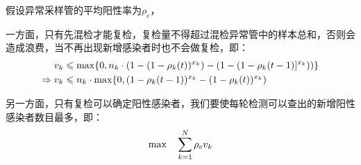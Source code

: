 \documentclass[withoutpreface,bwprint]{cumcmthesis} %
\begin{document}
假设异常采样管的平均阳性率为$\rho_{e}$，

一方面，只有先混检才能复检，复检量不得超过混检异常管中的样本总和，否则会造成浪费，当不再出现新增感染者时也不会做复检，即：
\begin{align}
    v_k &\leqslant {\rm max} \{0, n_k\cdot(1-(1-\rho_k(t))^{x_k})-(1-(1-\rho_k(t-1)]^{x_k})) \}\\
    \Rightarrow v_k &\leqslant n_k \cdot {\rm max} \{0, (1-\rho_k(t-1))^{x_k}-(1-\rho_k(t))^{x_k})
\end{align}

另一方面，只有复检可以确定阳性感染者，我们要使每轮检测可以查出的新增阳性感染者数目最多，即：
\begin{equation}
    {\rm max} \quad \sum^N_{k=1}\rho_e v_k
\end{equation}
\end{document}
